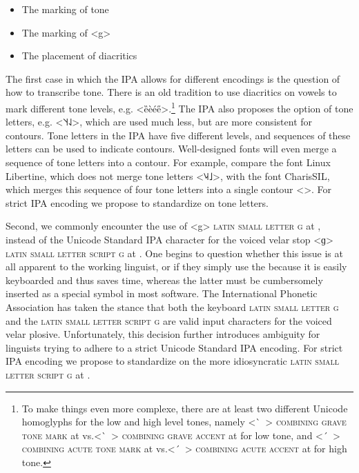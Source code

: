 \begin{itemize}
  \item The marking of tone
  \item The marking of <g>
  \item The placement of diacritics
\end{itemize}

The first case in which the IPA allows for different encodings is the question
of how to transcribe tone. There is an old tradition to use diacritics on vowels
to mark different tone levels, e.g. <ȅèée̋>.\footnote{To make things even more
complexe, there are at least two different Unicode homoglyphs for the low and
high level tones, namely <\ ̀~> \textsc{combining grave tone mark} at
 vs.\@ <\ ̀~> \textsc{combining grave accent} at  for low
tone, and <\ ́~> \textsc{combining acute tone mark} at  vs.\@ <\ ́~>
\textsc{combining acute accent} at  for high tone.} The IPA also
proposes the option of tone letters, e.g. <˥˦˧˨˩>, which are used much less, but
are more consistent for contours. Tone letters in the IPA have five different levels, and
sequences of these letters can be used to indicate contours. Well-designed fonts
will even merge a sequence of tone letters into a contour. For example, compare
the font Linux Libertine, which does not merge tone letters
<{˥˨˧˩}>, with the font CharisSIL, which merges this
sequence of four tone letters into a single contour <>. For strict
IPA encoding we propose to standardize on tone letters.

Second, we commonly encounter the use of <g> \textsc{latin small letter g} at
, instead of the Unicode Standard IPA character for the voiced velar
stop <ɡ> \textsc{latin small letter script g} at . One begins to
question whether this issue is at all apparent to the working linguist, or if
they simply use the  because it is easily keyboarded and thus saves
time, whereas the latter must be cumbersomely inserted as a special symbol in
most software. The International Phonetic Association has taken the stance that
both the keyboard \textsc{latin small letter g} and the \textsc{latin small
letter script g} are valid input characters for the voiced velar plosive.
Unfortunately, this decision further introduces ambiguity for linguists trying
to adhere to a strict Unicode Standard IPA encoding. For strict IPA encoding we
propose to standardize on the more idiosyncratic \textsc{latin small letter
script g} at .

